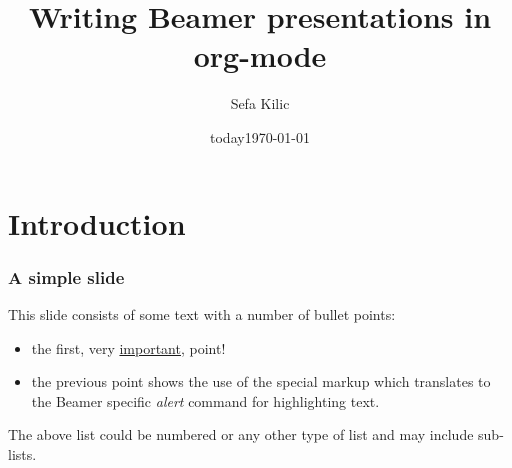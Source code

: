 \documentclass[bigger]{beamer}
\institute{institute goes here}
\date{today}
\title{Writing Beamer presentations in org-mode}
\author{Sefa Kilic}
\date{\today}
\begin{document}
\maketitle



\section{Introduction}
\label{sec-1}
\begin{frame}
\frametitle{A simple slide}
\label{sec-1-1}

This slide consists of some text with a number of bullet points:

\begin{itemize}
\item the first, very \underline{important}, point!
\item the previous point shows the use of the special markup which
  translates to the Beamer specific \emph{alert} command for highlighting
  text.
\end{itemize}


The above list could be numbered or any other type of list and may
include sub-lists.
\end{frame}
\end{document}
